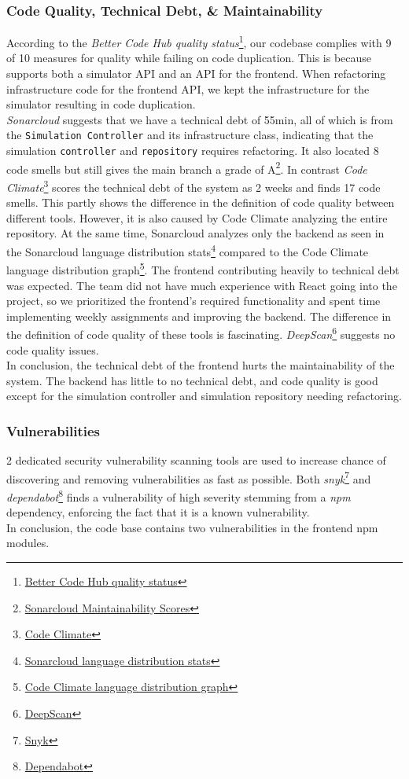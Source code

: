 \subsubsection{Code Quality, Technical Debt, \& Maintainability}
According to the \textit{Better Code Hub quality status}\footnote{\hyperref[fig:hubStatus]{Better Code Hub quality status}}, our codebase complies with 9 of 10 measures for quality while failing on code duplication. This is because \mini supports both a simulator API and an API for the frontend. When refactoring infrastructure code for the frontend API, we kept the infrastructure for the simulator resulting in code duplication.\\
\textit{Sonarcloud} suggests that we have a technical debt of 55min, all of which is from the \texttt{Simulation Controller} and its infrastructure class, indicating that the simulation \texttt{controller} and \texttt{repository} requires refactoring. It also located 8 code smells but still gives the main branch a grade of A\footnote{\hyperref[fig:cloudMaintainability]{Sonarcloud Maintainability Scores}}. In contrast \textit{Code Climate}\footnote{\hyperref[app:codeClimate]{Code Climate}} scores the technical debt of the system as 2 weeks and finds 17 code smells. This partly shows the difference in the definition of code quality between different tools. However, it is also caused by Code Climate analyzing the entire repository. At the same time, Sonarcloud analyzes only the backend as seen in the Sonarcloud language distribution stats\footnote{\hyperref[fig:codeClimateLangDis]{Sonarcloud language distribution stats}} compared to the Code Climate language distribution graph\footnote{\hyperref[fig:codeClimateLangDis]{Code Climate language distribution graph}}. The frontend contributing heavily to technical debt was expected. The team did not have much experience with React going into the project, so we prioritized the frontend's required functionality and spent time implementing weekly assignments and improving the backend. The difference in the definition of code quality of these tools is fascinating. \textit{DeepScan}\footnote{\hyperref[app:codeAnalDeep]{DeepScan}} suggests no code quality issues. \\
In conclusion, the technical debt of the frontend hurts the maintainability of the system. The backend has little to no technical debt, and code quality is good except for the simulation controller and simulation repository needing refactoring.

\subsubsection{Vulnerabilities}
2 dedicated security vulnerability scanning tools are used to increase chance of discovering and removing vulnerabilities as fast as possible. Both \textit{snyk}\footnote{\hyperref[app:codeAnalSnyk]{Snyk}} and \textit{dependabot}\footnote{\hyperref[app:codeAnalDependabot]{Dependabot}} finds a vulnerability of high severity stemming from a \textit{npm} dependency, enforcing the fact that it is a known vulnerability. \\
In conclusion, the \mini code base contains two vulnerabilities in the frontend npm modules.





